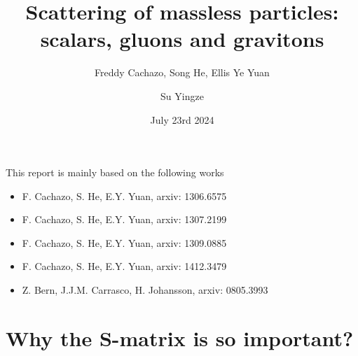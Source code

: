 \documentclass{beamer}
\title[CHY formula]{Scattering of massless particles: scalars, gluons and gravitons}
\subtitle{Freddy Cachazo, Song He, Ellis Ye Yuan}
\author{Su Yingze}
\institute{Nagoya University}
\date[7 23rd 2024]{July 23rd 2024}
\begin{document}
\frame{\titlepage}
\begin{frame}
    This report is mainly based on the following works
    \begin{itemize}
        \item F. Cachazo, S. He, E.Y. Yuan, arxiv: 1306.6575
        \item F. Cachazo, S. He, E.Y. Yuan, arxiv: 1307.2199
        \item F. Cachazo, S. He, E.Y. Yuan, arxiv: 1309.0885
        \item F. Cachazo, S. He, E.Y. Yuan, arxiv: 1412.3479
        \item Z. Bern, J.J.M. Carrasco, H. Johansson, arxiv: 0805.3993
    \end{itemize}
\end{frame}

\section{Why the S-matrix is so important?}
\end{document}

